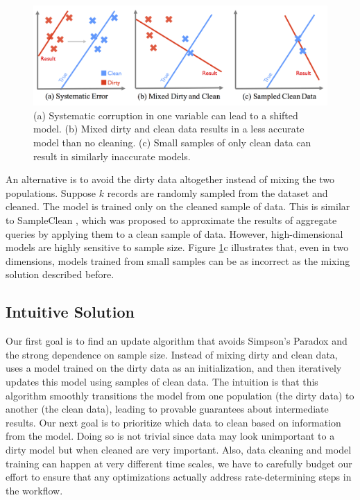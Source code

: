 \begin{figure}[ht!]
\centering
 \includegraphics[width=\columnwidth]{figs/update-arch.png}
 \caption{(a) Systematic corruption in one variable can lead to a shifted model. 
 (b) Mixed dirty and clean data results in a less accurate model than no cleaning.
(c) Small samples of only clean data can result in similarly inaccurate models. \label{update-arch1}}
\end{figure}

An alternative is to avoid the dirty data altogether instead of mixing the two populations.
Suppose $k$ records are randomly sampled from the dataset and cleaned.
The model is trained only on the cleaned sample of data.
This is similar to SampleClean \cite{wang1999sample}, which was proposed to approximate the results of aggregate queries by applying them to a clean sample of data.
However, high-dimensional models are highly sensitive to sample size.
Figure \ref{update-arch1}c illustrates that, even in two dimensions, models trained from small samples can be as incorrect as the mixing solution described before.

\subsection{Intuitive Solution}
Our first goal is to find an update algorithm that avoids Simpson's Paradox and the strong dependence on sample size.
Instead of mixing dirty and clean data, \sys uses a model trained on the dirty data as an initialization, and then iteratively updates this model using samples of clean data.
The intuition is that this algorithm smoothly transitions the model from one population (the dirty data) to another (the clean data), leading to provable guarantees about intermediate results.
Our next goal is to prioritize which data to clean based on information from the model.
Doing so is not trivial since data may look unimportant to a dirty model but when cleaned are very important.
Also, data cleaning and model training can happen at very different time scales, we have to carefully budget our effort to ensure that any optimizations actually address rate-determining steps in the workflow.

